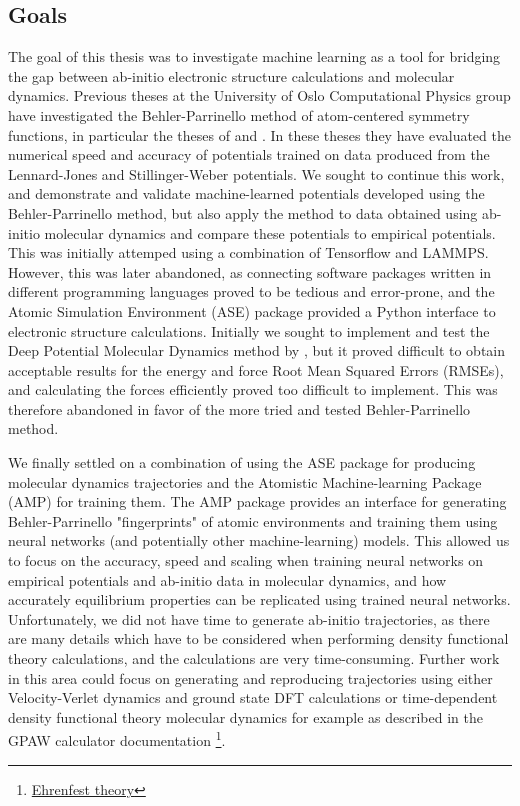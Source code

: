 \subsection{Goals}
The goal of this thesis was to investigate machine learning
as a tool for bridging the gap between ab-initio electronic structure
calculations and molecular dynamics. Previous theses at the University
of Oslo Computational Physics group have investigated the Behler-Parrinello
method of atom-centered symmetry functions, in particular the theses of
\parencite[Stende, John A,]{stende2017constructing} and
\parencite[Treider, H{\aa}kon Vik{\o}r]{treider2017speeding}.
In these theses they have evaluated the
numerical speed and accuracy of potentials trained on data
produced from the Lennard-Jones
and Stillinger-Weber potentials.
We sought to continue this work, and demonstrate and validate machine-learned
potentials developed using the Behler-Parrinello method, but also apply
the method to data obtained using ab-initio molecular dynamics
and compare these potentials to empirical potentials.
This was initially attemped using a combination of Tensorflow and LAMMPS.
However, this was later abandoned, as connecting software packages written
in different programming languages proved to be tedious and error-prone,
and the Atomic Simulation Environment (ASE) package provided a Python interface to
electronic structure calculations.
Initially we sought to implement and test the Deep Potential Molecular Dynamics
method by \parencite[Zhang et al.]{PhysRevLett.120.143001}, but
it proved difficult to obtain acceptable results for the energy
and force Root Mean Squared Errors (RMSEs), and calculating the forces
efficiently proved too difficult to implement. This was therefore abandoned
in favor of the more tried and tested Behler-Parrinello method.
\par
We finally settled on a combination of using the ASE package for producing
molecular dynamics trajectories and the Atomistic Machine-learning Package
(AMP) for training them. The AMP package provides an interface
for generating Behler-Parrinello "fingerprints" of atomic environments
and training them using neural networks (and potentially other machine-learning)
models. This allowed us to focus on the accuracy, speed and scaling
when training neural networks on empirical potentials and ab-initio
data in molecular dynamics, and how accurately equilibrium properties
can be replicated using trained neural networks.
Unfortunately, we did not have time to generate ab-initio trajectories,
as there are many details which have to be considered when performing
density functional theory calculations, and the calculations are very
time-consuming. Further work in this area could focus on generating
and reproducing trajectories using either Velocity-Verlet dynamics
and ground state DFT calculations or time-dependent density functional
theory molecular dynamics for example as described in the GPAW calculator documentation
\footnote{\href{https://wiki.fysik.dtu.dk/gpaw/documentation/ehrenfest/ehrenfest_theory
.html}{Ehrenfest theory}}.

